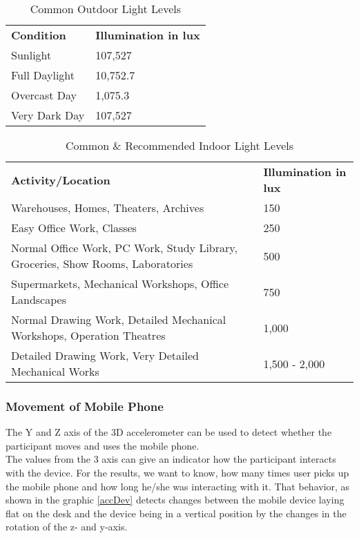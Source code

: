 \setlength{\tabcolsep}{10pt}
\renewcommand{\arraystretch}{1.5}
{

\begin{table}[!htb]
\centering
\begin{tabular}{ |p{4cm}|p{4cm}|  }
 \hline
 \rowcolor{lightgray} \multicolumn{2}{|c|}{{\bf Common Light Levels Outdoor - Daytime}} \\
 \hline
{\bf Condition} & {\bf Illumination in lux}\\
 \hline
 Sunlight   		& 107,527\\
 Full Daylight   	& 10,752.7\\
 Overcast Day	& 1,075.3\\
 Very Dark Day	& 107,527\\
 \hline
\end{tabular}
\caption{Common Outdoor Light Levels}
\label{outLight}
\end{table}

\begin{table}[!htb]
\centering
\begin{tabular}{ |p{10cm}|p{4cm}|  }
 \hline
 \rowcolor{lightgray} \multicolumn{2}{|c|}{{\bf Common and Recommended Light Levels Indoor}} \\
 \hline
{\bf Activity/Location} & {\bf Illumination in lux}\\
 \hline
 Warehouses, Homes, Theaters, Archives   																	& 150\\
 Easy Office Work, Classes   																						& 250\\
 Normal Office Work, PC Work, Study Library, Groceries, Show Rooms, Laboratories	& 500\\
 Supermarkets, Mechanical Workshops, Office Landscapes 											& 750\\
 Normal Drawing Work, Detailed Mechanical Workshops, Operation Theatres 				& 1,000\\
 Detailed Drawing Work, Very Detailed Mechanical Works 											& 1,500 - 2,000\\
 \hline
\end{tabular}
\caption{Common \& Recommended Indoor Light Levels}
\label{inLight}
\end{table}

\FloatBarrier
\clearpage

\subsubsection{Movement of Mobile Phone}
The Y and Z axis of the 3D accelerometer can be used to detect whether the participant moves and uses the mobile phone.\\
The values from the 3 axis can give an indicator how the participant interacts with the device. For the results, we want to know, how many times user picks up the mobile phone and how long he/she was interacting with it. That behavior, as shown in the graphic \ref{accDev} detects changes between the mobile device laying flat on the desk and the device being in a vertical position by the changes in the rotation of the z- and y-axis.  

}

